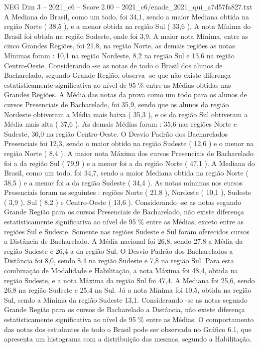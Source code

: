 \begin{textsample}{NEG Dim 3 – 2021\_c6 – Score 2.00 – 2021\_c6/enade\_2021\_qui\_a7d57fa827.txt}
A Mediana do Brasil, como um todo, foi 34,1, sendo a maior Mediana obtida na região Norte ( 38,5 ), e a menor obtida na região Sul ( 33,6 ).
A nota Mínima do Brasil foi obtida na região Sudeste, onde foi 3,9.
A maior nota Mínima, entre as cinco Grandes Regiões, foi 21,8, na região Norte, as demais regiões as notas Mínimas foram : 10,1 na região Nordeste, 8,2 na região Sul e 13,6 na região Centro-Oeste.
Considerando -se as notas de todo o Brasil dos alunos de Bacharelado, segundo Grande Região, observa -se que não existe diferença estatisticamente significativa ao nível de 95 \% entre as Médias obtidas nas Grandes Regiões.
A Média das notas da prova como um todo para os alunos de cursos Presenciais de Bacharelado, foi 35,9, sendo que os alunos da região Nordeste obtiveram a Média mais baixa ( 35,3 ), e os da região Sul obtiveram a Média mais alta ( 37,6 ).
As demais Médias foram : 35,6 nas regiões Norte e Sudeste, 36,0 na região Centro-Oeste.
O Desvio Padrão dos Bacharelados Presenciais foi 12,3, sendo o maior obtido na região Sudeste ( 12,6 ) e o menor na região Norte ( 8,4 ).
A maior nota Máxima dos cursos Presenciais de Bacharelado foi a da região Sul ( 79,9 ) e a menor foi a da região Norte ( 47,1 ).
A Mediana do Brasil, como um todo, foi 34,7, sendo a maior Mediana obtida na região Norte ( 38,5 ) e a menor foi a da região Sudeste ( 34,4 ).
As notas mínimas nos cursos Presenciais foram as seguintes : regiões Norte ( 21,8 ), Nordeste ( 10,1 ), Sudeste ( 3,9 ), Sul ( 8,2 ) e Centro-Oeste ( 13,6 ).
Considerando -se as notas segundo Grande Região para os cursos Presenciais de Bacharelado, não existe diferença estatisticamente significativa ao nível de 95 \% entre as Médias, exceto entre as regiões Sul e Sudeste.
Somente nas regiões Sudeste e Sul foram oferecidos cursos a Distância de Bacharelado.
A Média nacional foi 26,8, sendo 27,8 a Média da região Sudeste e 26,4 a da região Sul.
O Desvio Padrão dos Bacharelados a Distância foi 8,0, sendo 8,4 na região Sudeste e 7,8 na região Sul.
Para esta combinação de Modalidade e Habilitação, a nota Máxima foi 48,4, obtida na região Sudeste, e a nota Máxima da região Sul foi 47,4.
A Mediana foi 25,6, sendo 26,8 na região Sudeste e 25,4 na Sul.
Já a nota Mínima foi 10,5, obtida na região Sul, sendo a Mínima da região Sudeste 13,1.
Considerando -se as notas segundo Grande Região para os cursos de Bacharelado a Distância, não existe diferença estatisticamente significativa ao nível de 95 \% entre as Médias.
O comportamento das notas dos estudantes de todo o Brasil pode ser observado no Gráfico 6.1, que apresenta um histograma com a distribuição das mesmas, segundo a Habilitação.

\end{textsample}
